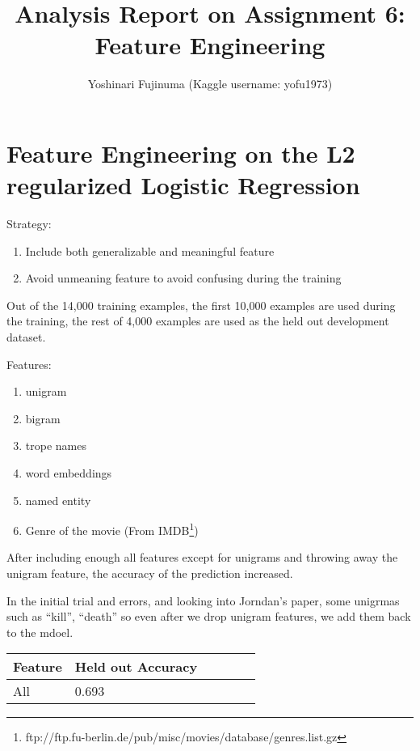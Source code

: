\documentclass[11pt]{article}
\begin{document}
\title{Analysis Report on Assignment 6: Feature Engineering}
\author{Yoshinari Fujinuma (Kaggle username: yofu1973)}
\date{}
\maketitle

\section{Feature Engineering on the L2 regularized Logistic Regression}

Strategy:
\begin{enumerate}
 \item Include both generalizable and meaningful feature 
 \item Avoid unmeaning feature to avoid confusing during the training
\end{enumerate}


Out of the 14,000 training examples, the first 10,000 examples are used during the training, the rest of 4,000 examples are used as the held out development dataset.

Features:
\begin{enumerate}
 \item unigram
 \item bigram
 \item trope names
 \item word embeddings
 \item named entity 
 \item Genre of the movie (From IMDB\footnote{ftp://ftp.fu-berlin.de/pub/misc/movies/database/genres.list.gz})
\end{enumerate}

After including enough all features except for unigrams and throwing away the unigram feature, the accuracy of the prediction increased.

In the initial trial and errors, and looking into Jorndan's paper, some unigrmas such as ``kill'', ``death'' so even after we drop unigram features, we add them back to the mdoel.

\begin{table}[h]
  \centering
  \begin{tabular}{|l|l|r|r|r|r|}
  \hline \bf Feature     & \bf Held out Accuracy     \\ \hline
   All                   & 0.693 \\ \hline
  \end{tabular}
\end{table}
\end{document}
